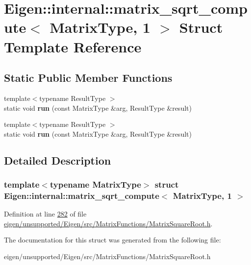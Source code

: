 \hypertarget{struct_eigen_1_1internal_1_1matrix__sqrt__compute_3_01_matrix_type_00_011_01_4}{}\section{Eigen\+:\+:internal\+:\+:matrix\+\_\+sqrt\+\_\+compute$<$ Matrix\+Type, 1 $>$ Struct Template Reference}
\label{struct_eigen_1_1internal_1_1matrix__sqrt__compute_3_01_matrix_type_00_011_01_4}
\subsection*{Static Public Member Functions}
\begin{DoxyCompactItemize}
\item 
\mbox{\label{struct_eigen_1_1internal_1_1matrix__sqrt__compute_3_01_matrix_type_00_011_01_4_a16745c82cc5be1e034af0405718c7988}} 
{\footnotesize template$<$typename Result\+Type $>$ }\\static void {\bfseries run} (const Matrix\+Type \&arg, Result\+Type \&result)
\item 
\mbox{\label{struct_eigen_1_1internal_1_1matrix__sqrt__compute_3_01_matrix_type_00_011_01_4_a16745c82cc5be1e034af0405718c7988}} 
{\footnotesize template$<$typename Result\+Type $>$ }\\static void {\bfseries run} (const Matrix\+Type \&arg, Result\+Type \&result)
\end{DoxyCompactItemize}


\subsection{Detailed Description}
\subsubsection*{template$<$typename Matrix\+Type$>$\newline
struct Eigen\+::internal\+::matrix\+\_\+sqrt\+\_\+compute$<$ Matrix\+Type, 1 $>$}



Definition at line \hyperlink{eigen_2unsupported_2_eigen_2src_2_matrix_functions_2_matrix_square_root_8h_source_l00282}{282} of file \hyperlink{eigen_2unsupported_2_eigen_2src_2_matrix_functions_2_matrix_square_root_8h_source}{eigen/unsupported/\+Eigen/src/\+Matrix\+Functions/\+Matrix\+Square\+Root.\+h}.



The documentation for this struct was generated from the following file\+:\begin{DoxyCompactItemize}
\item 
eigen/unsupported/\+Eigen/src/\+Matrix\+Functions/\+Matrix\+Square\+Root.\+h\end{DoxyCompactItemize}
